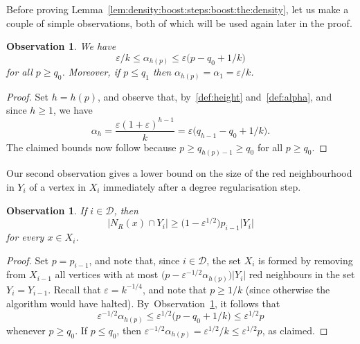 \documentclass[12pt,reqno]{amsart}
\newtheorem{obs}[theorem]{Observation}
\theoremstyle{definition}
\theoremstyle{remark}
\newcommand\eps{\varepsilon}
\renewcommand{\le}{\leqslant}
\renewcommand{\ge}{\geqslant}
\def\eps{\varepsilon}
\def\cD{\mathcal{D}}
\begin{document}
Before proving Lemma~\ref{lem:density:boost:steps:boost:the:density}, let us make a couple of simple observations, both of which will be used again later in the proof. %



\begin{obs}\label{obs:alpha:bounds}
We have
$$\eps / k \le \alpha_{h(p)} \le \eps \big( p - q_0 + 1/k \big)$$
for all\/ $p \ge q_0$. Moreover, if\/ $p \le q_1$ then $\alpha_{h(p)} = \alpha_1 = \eps/k$.
\end{obs}

\begin{proof}
Set $h = h(p)$, and observe that, by~\eqref{def:height} and~\eqref{def:alpha}, and since $h \ge 1$, we have 
$$\alpha_h = \frac{\eps (1+\eps)^{h-1}}{k} = \eps \big( q_{h-1} - q_0 + 1/k \big).$$
The claimed bounds now follow because $p \ge q_{h(p)-1} \ge q_0$ for all $p \ge q_0$. 
\end{proof}

Our second observation gives a lower bound on the size of the red neighbourhood in $Y_i$ of a vertex in $X_i$ immediately after a degree regularisation step.

\begin{obs}\label{obs:red:degree:lower:bound}
If\/ $i \in \cD$, then 
$$|N_R(x) \cap Y_i| \ge \big( 1 - \eps^{1/2} \big) p_{i-1} |Y_i|$$
for every $x \in X_i$. 
\end{obs}

\begin{proof}
Set $p = p_{i-1}$, and note that, since $i \in \cD$, the set $X_i$ is formed by removing from $X_{i-1}$ all vertices with at most $\big( p - \eps^{-1/2} \alpha_{h(p)} \big) |Y_i|$ red neighbours in the set $Y_i = Y_{i-1}$. %
Recall that $\eps = k^{-1/4}$, and note that $p \ge 1/k$ (since otherwise the algorithm would have halted). By~Observation~\ref{obs:alpha:bounds}, it follows that 
$$\eps^{-1/2}  \alpha_{h(p)} \le \eps^{1/2} \big( p - q_0 + 1/k \big) \le \eps^{1/2} p$$
whenever $p \ge q_0$. If $p \le q_0$, then $\eps^{-1/2} \alpha_{h(p)} = \eps^{1/2} / k \le \eps^{1/2} p$, as claimed.
\end{proof}
\end{document}
